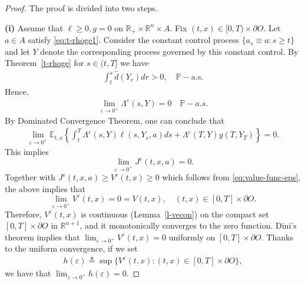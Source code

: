 \documentclass[11pt,reqno]{amsart}
\numberwithin{equation}{section}
\newcommand{\thmref}[1]{Theorem~{\rm \ref{#1}}}
\newcommand{\lemref}[1]{Lemma~{\rm \ref{#1}}}
\renewcommand{\P}{\mathbb{P}}
\begin{document}
\begin{proof} The proof is divided into two steps.

\noindent \textbf{(i)} Assume that $\ell \ge 0, g= 0$ on
$\mathbb{R}_{+}\times \mathbb{R}^n \times A$. 
    Fix $(t,x) \in [0,T)\times \partial O$. Let $a \in A$  satisfy
    \eqref{eq:t-rhoge1}. Consider the constant control process $\{a_s
    \equiv a: s\ge t\}$ and let $Y$ denote the corresponding
    process governed by this constant control. By \thmref{t-rhoge} for
    $s\in (t,T]$ we have 
    $$\begin{array}{ll}
      \displaystyle \int_t^s \hat d(Y_r) dr >0,  \quad \P-\text{a.s.}
    \end{array}$$
    Hence,
    $$\begin{array}{ll}
      \lim_{\varepsilon \to 0^+}\Lambda^\varepsilon(s, Y) = 0 \quad
      \P-a.s.
    \end{array}$$
    By Dominated Convergence Theorem, one can conclude that
    $$\begin{array}{ll}
      \lim_{\varepsilon \to 0^+} \mathbb{E}_{t,x}\left \{ \int_t^T
        \Lambda^\varepsilon(s, Y) \ell(s, Y_s, a) ds +
        \Lambda^\varepsilon(T, Y) g(T, Y_T)\right\}=0.
    \end{array}$$
    This implies 
    $$\lim_{\varepsilon \to 0^+} J^\varepsilon(t,x,a) = 0.$$
    Together with  $J^\varepsilon(t,x,a) \ge V^\varepsilon(t,x) \geq
    0$ which follows from \eqref{eq:value-func-eps}, the above implies
    that 
    \begin{equation}
      \label{eq:rk2}
      \lim_{\varepsilon\to 0^+} V^\varepsilon(t,x) = 0 = V(t,x), \quad
       (t,x)\in [0,T]\times \partial O.
    \end{equation}
    Therefore, $V^\varepsilon(t,x)$ is continuous (\lemref{l-vecon})
    on the compact set $[0,T] \times \partial O$ in
    $\mathbb{R}^{n+1}$, and it monotonically 
    converges to the zero function. Dini's theorem implies that
    $\lim_{\varepsilon \to 0^+} V^\varepsilon (t,x) = 0$ uniformly on
    $[0,T] \times \partial O$. Thanks to the uniform convergence, if we set
    $$\begin{array}{ll}
      h(\varepsilon) \triangleq \sup\{V^\varepsilon(t,x): (t,x)
      \in [0,T] \times \partial O\},
    \end{array}$$
     we have that $\lim_{\varepsilon\to 0^+}h(\varepsilon)  = 0$.
    

\end{proof}
\end{document}
